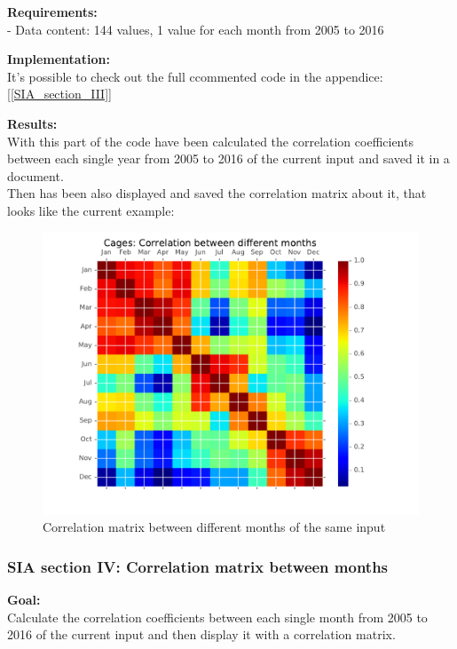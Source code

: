 \textbf{Requirements:}\\
- Data content: 144 values, 1 value for each month from 2005 to 2016

\textbf{Implementation:}\\
It's possible to check out the full ccommented code in the appendice: [\ref{SIA_section_III}]

\textbf{Results:} \\
With this part of the code have been calculated the correlation coefficients between each single year from 2005 to 2016 of the current input and saved it in a document. \\
Then has been also displayed and saved the correlation matrix about it, that looks like the current example:

\begin{figure}[H]
	\centering
    \includegraphics[width=1\textwidth]{Files/Cages_Months_Matrix.pdf}
    \caption{Correlation matrix between different months of the same input}
\end{figure}




\newpage
\subsubsection{SIA section IV: Correlation matrix between months}

\textbf{Goal:}\\
Calculate the correlation coefficients between each single month from 2005 to 2016 of the current input and then display it with a correlation matrix.

